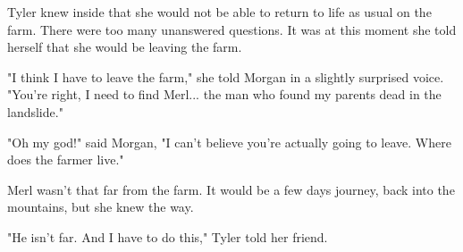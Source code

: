 \documentclass[courier]{sffms}
\begin{document}
Tyler knew inside that she would not be
able to return to life as usual on the farm.
There were too many unanswered questions.
It was at this moment she told herself
that she would be leaving the farm.

"I think I have to leave the farm," she told
Morgan in a slightly surprised voice. "You're
right, I need to find Merl... the man who 
found my parents dead in the landslide."

"Oh my god!" said Morgan, "I can't believe
you're actually going to leave. Where does
the farmer live."

Merl wasn't that far from the farm. It would
be a few days journey, back into the mountains,
but she knew the way.

"He isn't far. And I have to do this," Tyler told 
her friend.
\end{document}
